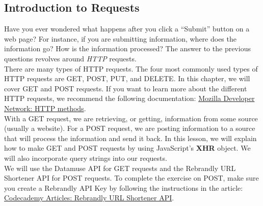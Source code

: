 \documentclass[11pt]{article}
\begin{document}
\subsection{Introduction to Requests}
Have you ever wondered what happens after you click a “Submit” button on a web page? For instance, if you are submitting information, where does the information go? How is the information processed? The answer to the previous questions revolves around \textit{HTTP} requests. \\
\newline
There are many types of HTTP requests. The four most commonly used types of HTTP requests are GET, POST, PUT, and DELETE. In this chapter, we will cover GET and POST requests. If you want to learn more about the different HTTP requests, we recommend the following documentation: \href{https://developer.mozilla.org/en-US/docs/Web/HTTP/Methods}{Mozilla Developer Network: HTTP methods}. \\
\newline
With a GET request, we are retrieving, or getting, information from some source (usually a website). For a POST request, we are posting information to a source that will process the information and send it back. In this lesson, we will explain how to make GET and POST requests by using JavaScript’s \textbf{XHR} object. We will also incorporate query strings into our requests. \\
\newline
We will use the Datamuse API for GET requests and the Rebrandly URL Shortener API for POST requests. To complete the exercise on POST, make sure you create a Rebrandly API Key by following the instructions in the article: \href{https://www.codecademy.com/articles/rebrandly-signup}{Codecademy Articles: Rebrandly URL Shortener API}.
\end{document}
